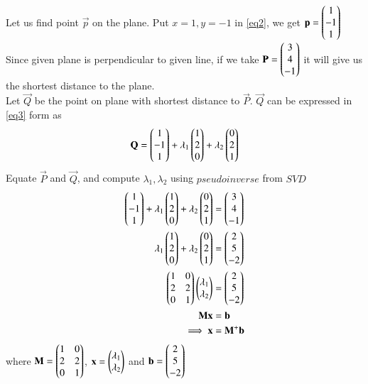 \documentclass[journal,12pt,twocolumn]{IEEEtran}
\begin{document}
Let us find point $\vec{p}$ on the plane. Put $x=1,y=-1$ in \eqref{eq2}, we get $\mathbf{p} = \begin{pmatrix}1\\-1\\1\end{pmatrix}$\\
Since given plane is perpendicular to given line, if we take $\mathbf{P} = \begin{pmatrix}3 \\ 4 \\ -1\end{pmatrix}$ it will give us the shortest distance to the plane. \\
Let $\vec{Q}$ be the point on plane with shortest distance to $\vec{P}$. $\vec{Q}$ can be expressed in \eqref{eq3} form as
\begin{align}\label{eq6}
	\mathbf{Q} = \begin{pmatrix}1\\-1\\1\end{pmatrix} + \lambda_1\begin{pmatrix}1\\2\\0\end{pmatrix} + \lambda_2\begin{pmatrix}0\\2\\1\end{pmatrix}
\end{align}
Equate $\vec{P}$ and $\vec{Q}$, and compute $\lambda_1, \lambda_2$ using $\textit{pseudoinverse}$ from $\textit{SVD}$
\begin{align}
	\label{eq7}\begin{pmatrix}1\\-1\\1\end{pmatrix} + \lambda_1\begin{pmatrix}1\\2\\0\end{pmatrix} + \lambda_2\begin{pmatrix}0\\2\\ 1\end{pmatrix} &= \begin{pmatrix}3\\4\\-1\end{pmatrix}\\
	\label{eq8}\lambda_1\begin{pmatrix}1\\2\\0\end{pmatrix} + \lambda_2\begin{pmatrix}0\\2\\ 1\end{pmatrix} &= \begin{pmatrix}2\\5\\-2\end{pmatrix}\\
	\label{eq9}\begin{pmatrix}1 & 0\\2 & 2\\0 & 1\end{pmatrix} \begin{pmatrix}\lambda_1 \\ \lambda_2\end{pmatrix} &=\begin{pmatrix}2\\5\\-2\end{pmatrix}\\
	\label{eq10}\mathbf{M}\mathbf{x} &= \mathbf{b}\\
	\label{eq11}\implies\mathbf{x} &= \mathbf{M}^{+}\mathbf{b}
\end{align}
where $\mathbf{M} = \begin{pmatrix}1 & 0\\2 & 2\\0 & 1\end{pmatrix}$, $\mathbf{x}= \begin{pmatrix}\lambda_1 \\ \lambda_2\end{pmatrix}$ and $\mathbf{b}=\begin{pmatrix}2\\5\\-2\end{pmatrix}$
\end{document}

